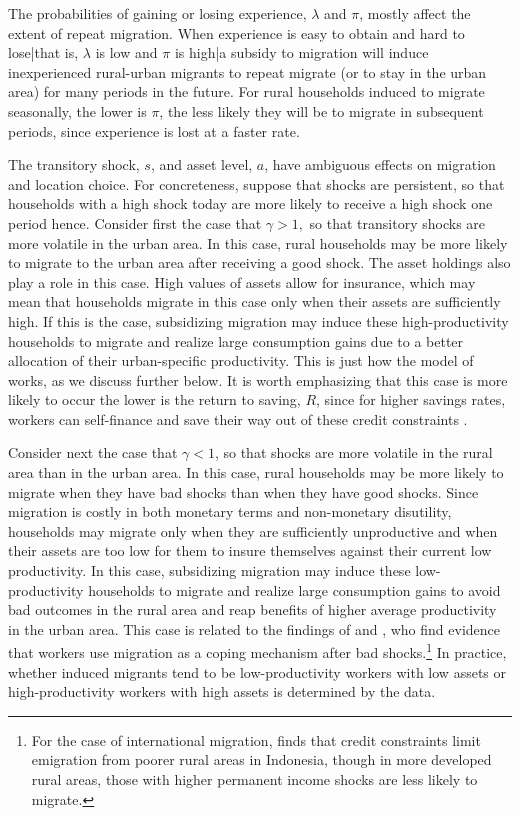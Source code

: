 \documentclass[12pt,pdftex]{article}
\begin{document}
The probabilities of gaining or losing experience, $\lambda$ and $\pi$, mostly affect the extent of repeat migration. When experience is easy to obtain and hard to lose|that is, $\lambda$ is low and $\pi$ is high|a subsidy to migration will induce inexperienced rural-urban migrants to repeat migrate (or to stay in the urban area) for many periods in the future. For rural households induced to migrate seasonally, the lower is $\pi$, the less likely they will be to migrate in subsequent periods, since experience is lost at a faster rate.

The transitory shock, $s$, and asset level, $a$, have ambiguous effects on migration and location choice. For concreteness, suppose that shocks are persistent, so that households with a high shock today are more likely to receive a high shock one period hence. Consider first the case that $\gamma>1,$ so that transitory shocks are more volatile in the urban area. In this case, rural households may be more likely to migrate to the urban area after receiving a good shock. The asset holdings also play a role in this case. High values of assets allow for insurance, which may mean that households migrate in this case only when their assets are sufficiently high. If this is the case, subsidizing migration may induce these high-productivity households to migrate and realize large consumption gains due to a better allocation of their urban-specific productivity. This is just how the model of \citet{brch14} works, as we discuss further below. It is worth emphasizing that this case is more likely to occur the lower is the return to saving, $R$, since for higher savings rates, workers can self-finance and save their way out of these credit constraints \citep[see, e.g.,][]{mixu14,moll14,dono16}.

Consider next the case that $\gamma<1$, so that shocks are more volatile in the rural area than in the urban area. In this case, rural households may be more likely to migrate when they have bad shocks than when they have good shocks. Since migration is costly in both monetary terms and non-monetary disutility, households may migrate only when they are sufficiently unproductive and when their assets are too low for them to insure themselves against their current low productivity. In this case, subsidizing migration may induce these low-productivity households to migrate and realize large consumption gains to avoid bad outcomes in the rural area and reap benefits of higher average productivity in the urban area. This case is related to the findings of \citet{grzy16} and \citet{klee15}, who find evidence that workers use migration as a coping mechanism after bad shocks.\footnote{For the case of international migration, \citet{bazz17} finds that credit constraints limit emigration from poorer rural areas in Indonesia, though in more developed rural areas, those with higher permanent income shocks are less likely to migrate.} In practice, whether induced migrants tend to be low-productivity workers with low assets or high-productivity workers with high assets is determined by the data.
\end{document}
